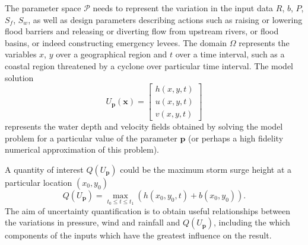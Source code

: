 The parameter space $\mathcal{P}$ needs to represent the variation in the input data $R$, $b$, $P$, $S_f$, $S_w$, as well as design parameters describing actions such as raising or lowering flood barriers and releasing or diverting flow from upstream rivers, or flood basins, or indeed constructing emergency levees. 
The domain $\Omega$ represents the variables $x$, $y$ over a geographical region and $t$ over a time interval, such as a  coastal region threatened by a cyclone over particular time interval. The model solution 
$$
U_{\mathbf{p}} (\mathbf{x})  = \begin{bmatrix} h(x,y,t) \\ u(x,y,t) \\ v(x,y,t) \end{bmatrix}
$$
represents the water depth and velocity fields obtained by solving the model problem for a particular value of the parameter $\mathbf{p}$ (or perhaps a high fidelity numerical approximation of this problem). 

A quantity of interest $Q(U_{\mathbf{p}})$ could be the maximum storm surge height at a particular location $(x_0, y_0)$
$$ 
Q(U_{\mathbf{p}})  = \max_{t_0 \leq t \leq t_1} \left( h(x_0,y_0,t) + b(x_0,y_0) \right).
$$
The aim of  uncertainty quantification is to obtain useful relationships between the variations in pressure, wind and rainfall  and $Q(U_{\mathbf{p}})$, including the which components of the inputs  which have the greatest influence on the result. 





